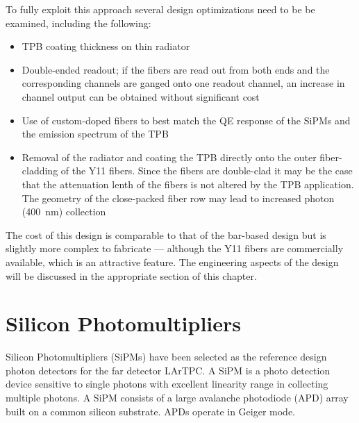 To fully exploit this approach several design optimizations need to be
be examined, including the following:

\begin{itemize}

\item{TPB coating thickness on thin radiator}

\item{Double-ended readout; if the fibers are read out from both
  ends and the corresponding channels are ganged onto one readout
  channel, an increase in channel output can be obtained without
  significant cost}

\item{Use of custom-doped fibers to best match the QE response of the
  SiPMs and the emission spectrum of the TPB}

\item{Removal of the radiator and coating the TPB directly onto the outer
  fiber-cladding of the Y11 fibers. Since the fibers are double-clad
  it may be the case that the attenuation lenth of the fibers is not
  altered by the TPB application. The geometry of the close-packed
  fiber row may lead to increased photon (400~nm) collection}

\end{itemize}

The cost of this design is comparable to that of the bar-based design
but is slightly more complex to fabricate --- although the Y11 fibers
are commercially available, which is an attractive feature. The
engineering aspects of the design will be discussed in the appropriate
section of this chapter. 

\section{Silicon Photomultipliers}

Silicon Photomultipliers (SiPMs) have been selected as the reference design  photon
detectors for the far detector LArTPC.%
  A SiPM is
a photo detection device sensitive to single photons with excellent
linearity range  in collecting multiple photons.  A SiPM consists of a
large avalanche photodiode (APD) array built on a common silicon
substrate. APDs operate in Geiger mode.  

